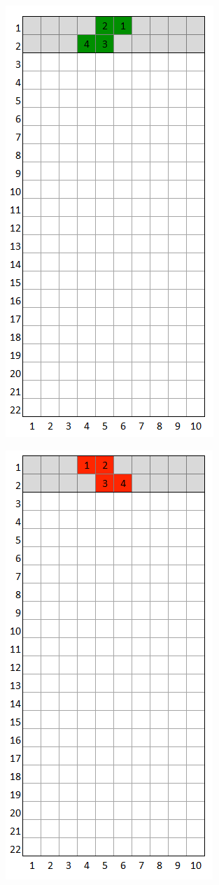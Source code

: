 \documentclass[a4paper]{article}
\begin{document}
	\begin{minipage}{0.2\textwidth}
		\centering
		\includegraphics[scale=0.4]{resources/img/minos/mino_green}
		\label{fig:mino-green}
	\end{minipage}
	\begin{minipage}{0.26\textwidth}
		\centering
		\includegraphics[scale=0.4]{resources/img/minos/mino_red}
		\label{fig:mino-red}
	\end{minipage}%
\end{document}
